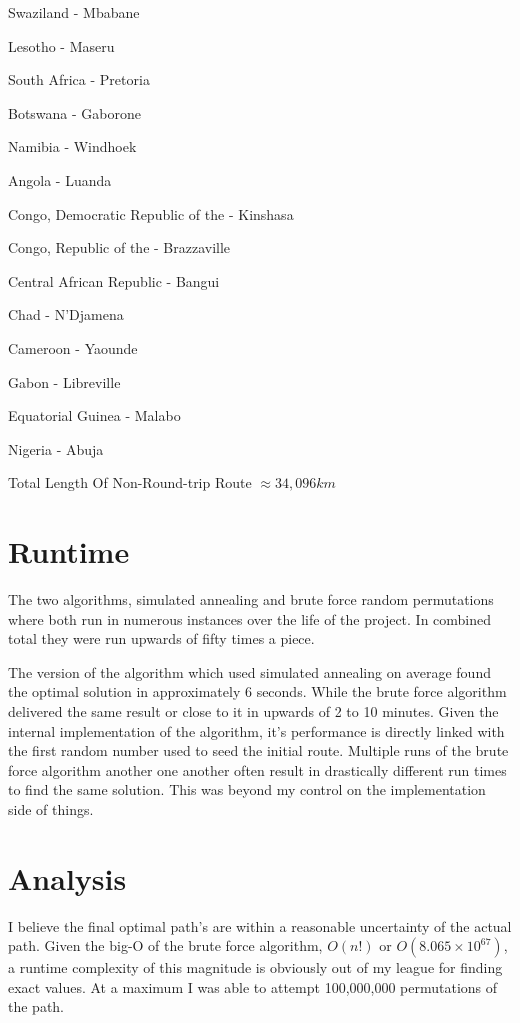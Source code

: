 \documentclass[12pt]{article}
\begin{document}
\begin{multicols}{3}
\begin{enumerate*}
\item Swaziland - Mbabane
\item Lesotho - Maseru
\item South Africa - Pretoria 
\item Botswana - Gaborone
\item Namibia - Windhoek
\item Angola - Luanda
\item Congo, Democratic Republic of the - Kinshasa
\item Congo, Republic of the - Brazzaville
\item Central African Republic - Bangui
\item Chad - N'Djamena
\item Cameroon - Yaounde
\item Gabon - Libreville
\item Equatorial Guinea - Malabo
\item Nigeria - Abuja
\end{enumerate*}
\end{multicols}

Total Length Of Non-Round-trip Route $\approx 34,096 km$

\section{Runtime}

The two algorithms, simulated annealing and brute force random permutations where both run in numerous instances over the life of the project. 
In combined total they were run upwards of fifty times a piece.

The version of the algorithm which used simulated annealing on average found the optimal solution in approximately 6 seconds. 
While the brute force algorithm delivered the same result or close to it in upwards of 2 to 10 minutes. Given the internal implementation of the algorithm, it's performance is directly linked with the first random number used to seed the initial route.
Multiple runs of the brute force algorithm another one another often result in drastically different run times to find the same solution. This was beyond my control on the implementation side of things.

\section{Analysis}

I believe the final optimal path's are within a reasonable uncertainty of the actual path.
Given the big-O of the brute force algorithm, $O(n!)$ or $O( 8.065 \times 10^{67} )$, a runtime complexity of this magnitude is obviously out of my league for finding exact values.
At a maximum I was able to attempt 100,000,000 permutations of the path.
\end{document}
